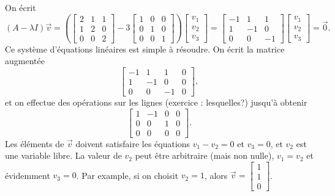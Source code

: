 \begin{example}
On écrit
\begin{equation*}
(A-\lambda I) \vec{v} = 
\left(
\begin{bmatrix}
2 & 1 & 1 \\
1 & 2 & 0 \\
0 & 0 & 2
\end{bmatrix}
- 3
\begin{bmatrix}
1 & 0 & 0 \\
0 & 1 & 0 \\
0 & 0 & 1
\end{bmatrix}
\right)
\begin{bmatrix}
v_1 \\ v_2 \\ v_3
\end{bmatrix}
=
\begin{bmatrix}
-1 & 1 & 1 \\
1 & -1 & 0 \\
0 & 0 & -1
\end{bmatrix}
\begin{bmatrix}
v_1 \\ v_2 \\ v_3
\end{bmatrix}
=
\vec{0} .
\end{equation*}
Ce système d’équations linéaires est simple à résoudre. On écrit la matrice augmentée
\begin{equation*}
\left[
\begin{array}{ccc|c}
-1 & 1 & 1 & 0 \\
1 & -1 & 0 & 0 \\
0 & 0 & -1 & 0
\end{array}
\right] ,
\end{equation*}
et on effectue des opérations sur les lignes (exercice : lesquelles?) jusqu’à obtenir
\begin{equation*}
\left[
\begin{array}{ccc|c}
1 & -1 & 0 & 0 \\
0 & 0 & 1 & 0 \\
0 & 0 & 0 & 0
\end{array}
\right] .
\end{equation*}
Les éléments de $\vec{v}$ doivent satisfaire les équations
$v_1 - v_2 = 0$ et $v_3 = 0$, et $v_2$ est une variable libre. La valeur de $v_2$ peut être arbitraire (mais non nulle),
$v_1 = v_2$ et évidemment $v_3 = 0$.
Par example, si on choisit $v_2 = 1$, alors
$\vec{v} =
\left[ \begin{smallmatrix} 1 \\ 1 \\ 0 \end{smallmatrix} \right]$.

\end{example}
